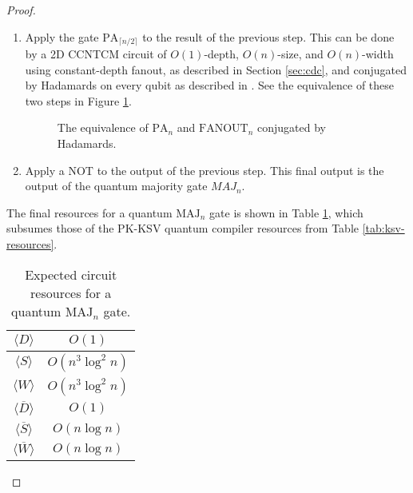 \begin{proof}
\begin{enumerate}
\item
Apply the gate $\text{PA}_{\lceil n/2 \rceil}$ to the result of
the previous step. This can be done by a \textsf{2D CCNTCM} circuit of
$O(1)$-depth, $O(n)$-size, and $O(n)$-width using constant-depth
fanout, as described in Section \ref{sec:cdc}, and conjugated by
Hadamards on every qubit as described in \cite{Moore1998}. See
the equivalence of these two steps in Figure \ref{fig:pa-fanout}.

\begin{figure}[htb!]
\caption{The equivalence of $\text{PA}_n$ and $\text{FANOUT}_n$ conjugated by Hadamards.}
\label{fig:pa-fanout}
\end{figure}

\item
Apply a NOT to the output of the previous step. This final
output is the output of the quantum majority gate $MAJ_{n}$.

\end{enumerate}

The final resources for a quantum $\text{MAJ}_n$ gate is shown in
Table \ref{tab:maj-resources}, which subsumes those of the PK-KSV quantum compiler
resources from Table \ref{tab:ksv-resources}.

\begin{table}[htb!]
\begin{tabular}{c|c|}
\hline
$\langle D \rangle$ & $O(1)$ \\
\hline
$\langle S \rangle$ & $O(n^3\log^2 n)$ \\
\hline
$\langle W \rangle$ & $O(n^3 \log^2 n)$ \\
\hline
$\langle \overline{D} \rangle$ & $O(1)$ \\
\hline
$\langle \overline{S} \rangle$ & $O(n\log n)$ \\
\hline
$\langle \overline{W} \rangle$ & $O(n\log n)$ \\
\hline
\end{tabular}
\caption{Expected circuit resources for a quantum $\text{MAJ}_n$ gate.}
\label{tab:maj-resources}
\end{table}

\end{proof}